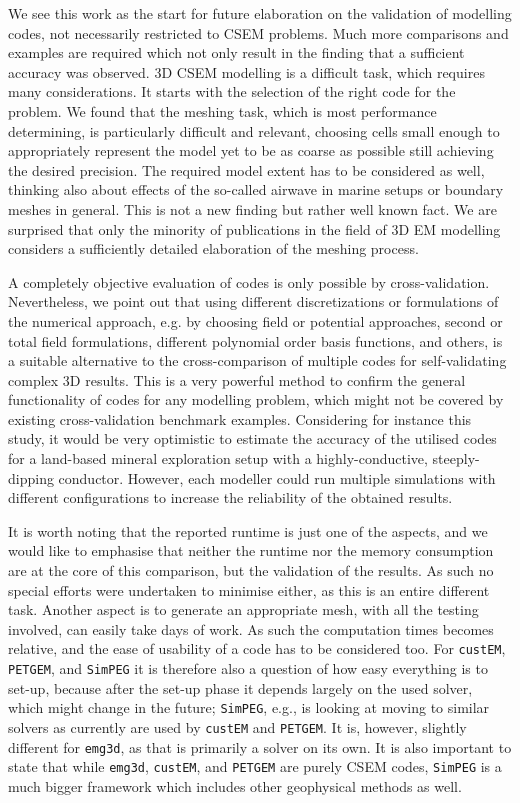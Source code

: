 \documentclass[
    paper,
  ]{geophysics}
\newcommand{\emg}[2]{\texttt{emg#1#2}\xspace}
\newcommand{\simpeg}{\texttt{SimPEG}\xspace}
\newcommand{\custem}{\texttt{custEM}\xspace}
\newcommand{\petgem}{\texttt{PETGEM}\xspace}
\begin{document}
We see this work as the start for future elaboration on the validation of modelling codes, not necessarily restricted to CSEM problems. Much more comparisons and examples are required which not only result in the finding that a sufficient accuracy was observed. 3D CSEM modelling is a difficult task, which requires many considerations. It starts with the selection of the right code for the problem. We found that the meshing task, which is most performance determining, is particularly difficult and relevant, choosing cells small enough to appropriately represent the model yet to be as coarse as possible still achieving the desired precision. The required model extent has to be considered as well, thinking also about effects of the so-called airwave in marine setups or boundary meshes in general. This is not a new finding but rather well known fact. We are surprised that only the minority of publications in the field of 3D EM modelling considers a sufficiently detailed elaboration of the meshing process.

A completely objective evaluation of codes is only possible by cross-validation. Nevertheless, we point out that using different discretizations or formulations of the numerical approach, e.g. by choosing field or potential approaches, second or total field formulations, different polynomial order basis functions, and others, is a suitable alternative to the cross-comparison of multiple codes for self-validating complex 3D results. This is a very powerful method to confirm the general functionality of codes for any modelling problem, which might not be covered by existing cross-validation benchmark examples. Considering for instance  this study, it would be very optimistic to estimate the accuracy of the utilised codes for a land-based mineral exploration setup with a highly-conductive, steeply-dipping conductor. However, each modeller could run multiple simulations with different configurations to increase the reliability of the obtained results.

It is worth noting that the reported runtime is just one of the aspects, and we would like to emphasise that neither the runtime nor the memory consumption are at the core of this comparison, but the validation of the results. As such no special efforts were undertaken to minimise either, as this is an entire different task. Another aspect is to generate an appropriate mesh, with all the testing involved, can easily take days of work. As such the computation times becomes relative, and the ease of usability of a code has to be considered too. For \custem, \petgem, and \simpeg it is therefore also a question of how easy everything is to set-up, because after the set-up phase it depends largely on the used solver, which might change in the future; \simpeg, e.g., is looking at moving to similar solvers as currently are used by \custem and \petgem. It is, however, slightly different for \emg3d, as that is primarily a solver on its own. It is also important to state that while \emg3d, \custem, and \petgem are purely CSEM codes, \simpeg is a much bigger framework which includes other geophysical methods as well.
\end{document}
